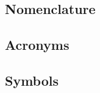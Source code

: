 \chapter{}\label{glossary}

\renewcommand{\glossarysection}[2][]{}
\renewcommand{\glsnamefont}[1]{\chapterfont\small\textbf{#1}}
\glsnoexpandfields  %


\section*{Nomenclature}\label{equipment}
\vspace{-30pt}
\glsaddall[types={nomenclature}]
\printglossary[type=nomenclature]


\section*{Acronyms}\label{acronyms}
\vspace{-30pt}
\glsaddall
\printglossary[type=\acronymtype]


\section*{Symbols}\label{symbols}
\vspace{-30pt}
\glsaddall
\printglossary[type=symbols]


\newpage